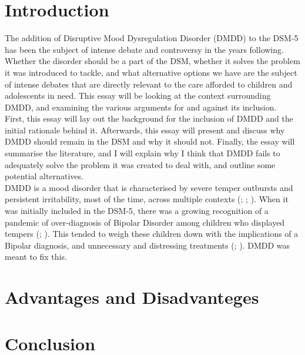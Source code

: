 \documentclass[stu,a4paper,12pt,donotrepeattitle]{apa7}
\begin{document}
\section{Introduction}
The addition of Disruptive Mood Dysregulation Disorder (DMDD) to the DSM-5 has
been the subject of intense debate and controversy in the years following.
Whether the disorder should be a part of the DSM, whether it solves the problem
it was introduced to tackle, and what alternative options we have are the
subject of intense debates that are directly relevant to the care afforded to
children and adolescents in need. This essay will be looking at the context
surrounding DMDD, and examining the various arguments for and against its
inclusion.\\
First, this essay will lay out the background for the inclusion of DMDD and the
initial rationale behind it. Afterwards, this essay will present and discuss
why DMDD should remain in the DSM and why it should not. Finally, the essay
will summarise the literature, and I will explain why I think that DMDD fails
to adequately solve the problem it was created to deal with, and outline some
potential alternatives.\\
DMDD is a mood disorder that is characterised by severe temper outbursts and
persistent irritability, most of the time, across multiple contexts
(\cite{baweja16}; \cite{franc13}; \cite{lochman15}). When it was initially
included in the DSM-5, there was a growing recognition of a pandemic of
over-diagnosis of Bipolar Disorder among children who displayed tempers
(\cite{baweja16}; \cite{lochman15}). This tended to weigh these children down
with the implications of a Bipolar diagnosis, and unnecessary and distressing
treatments (\cite{franc13}; \cite{lochman15}). DMDD was meant to fix this.
\section{Advantages and Disadvanteges}
\section{Conclusion}
\newpage
\printbibliography
\end{document}
